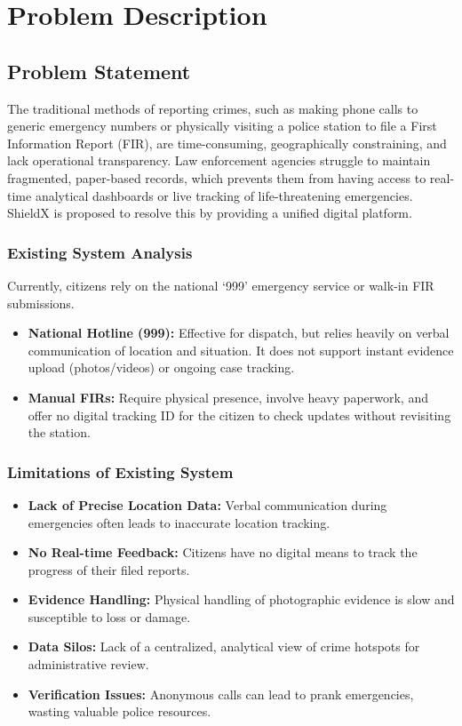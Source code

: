 \documentclass[12pt, a4paper, twoside]{report}
\begin{document}
\chapter{Problem Description}
\section{Problem Statement}
The traditional methods of reporting crimes, such as making phone calls to generic emergency numbers or physically visiting a police station to file a First Information Report (FIR), are time-consuming, geographically constraining, and lack operational transparency. Law enforcement agencies struggle to maintain fragmented, paper-based records, which prevents them from having access to real-time analytical dashboards or live tracking of life-threatening emergencies. ShieldX is proposed to resolve this by providing a unified digital platform.

\subsection{Existing System Analysis}
Currently, citizens rely on the national `999' emergency service or walk-in FIR submissions. 
\begin{itemize}[label={}, itemsep=1em]
    \item \textbf{National Hotline (999):} Effective for dispatch, but relies heavily on verbal communication of location and situation. It does not support instant evidence upload (photos/videos) or ongoing case tracking.
    \item \textbf{Manual FIRs:} Require physical presence, involve heavy paperwork, and offer no digital tracking ID for the citizen to check updates without revisiting the station.
\end{itemize}

\subsection{Limitations of Existing System}
\begin{itemize}[label={}, itemsep=1em]
    \item \textbf{Lack of Precise Location Data:} Verbal communication during emergencies often leads to inaccurate location tracking.
    \item \textbf{No Real-time Feedback:} Citizens have no digital means to track the progress of their filed reports.
    \item \textbf{Evidence Handling:} Physical handling of photographic evidence is slow and susceptible to loss or damage.
    \item \textbf{Data Silos:} Lack of a centralized, analytical view of crime hotspots for administrative review.
    \item \textbf{Verification Issues:} Anonymous calls can lead to prank emergencies, wasting valuable police resources.
\end{itemize}
\end{document}

